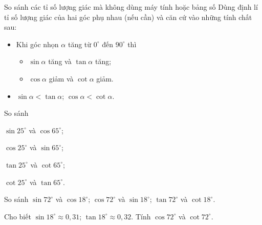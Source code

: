 \begin{dang}{So sánh các tỉ số lượng giác mà không dùng máy tính hoặc bảng số}
	Dùng định lí tỉ số lượng giác của hai góc phụ nhau (nếu cần) và căn cứ vào những tính chất sau:
	\begin{itemize}
	\item Khi góc nhọn $\alpha$ tăng từ $0^\circ$ đến $90^\circ$ thì
	\begin{itemize}
	\item $\sin \alpha$ tăng và $\tan \alpha$ tăng;
	\item $\cos \alpha$ giảm và $\cot \alpha$ giảm.
	\end{itemize}
	\item $\sin \alpha < \tan \alpha$; $\cos \alpha < \cot \alpha$.
	\end{itemize}
\end{dang}
\begin{vd}
	So sánh
	\begin{enumEX}{4}
	\item $\sin 25^\circ$ và $\cos 65^\circ$;
	\item $ \cos 25^\circ$ và $\sin 65^\circ$;
	\item $\tan 25^\circ$ và $\cot 65^\circ$;
	\item $\cot 25^\circ$ và $\tan 65^\circ$.
	\end{enumEX}
\end{vd}
\begin{vd}
	\begin{listEX}
	\item So sánh $\sin 72^\circ$ và $\cos 18^\circ$; $ \cos 72^\circ$ và $\sin 18^\circ$; $\tan 72^\circ$ và $\cot 18^\circ$.
	\item Cho biết $\sin 18^\circ\approx 0{,}31$; $\tan 18^\circ\approx 0{,}32$. Tính $\cos 72^\circ$ và $\cot 72^\circ$.
	\end{listEX}
\end{vd}
